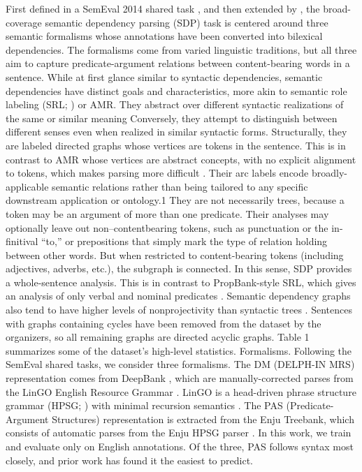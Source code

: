 \documentclass[11pt,a4paper]{article}
\begin{document}
First defined in a SemEval 2014 shared task
\cite{oepen2014semeval}, and then extended by \citet{oepen2015semeval},
the broad-coverage semantic dependency parsing (SDP) task is centered around three
semantic formalisms whose annotations have been
converted into bilexical dependencies. The formalisms come
from varied linguistic traditions, but all three aim
to capture predicate-argument relations between
content-bearing words in a sentence.
While at first glance similar to syntactic dependencies,
semantic dependencies have distinct
goals and characteristics, more akin to semantic
role labeling (SRL; \citet{gildea2002automatic}) or
AMR. They abstract over different
syntactic realizations of the same or similar meaning
Conversely, they attempt to distinguish
between different senses even when realized
in similar syntactic forms.
Structurally, they are labeled directed graphs
whose vertices are tokens in the sentence. This
is in contrast to AMR whose vertices are abstract
concepts, with no explicit alignment to tokens,
which makes parsing more difficult \cite{flanigan2014discriminative}.
Their arc labels encode broadly-applicable semantic relations rather than being tailored
to any specific downstream application or
ontology.1 They are not necessarily trees, because
a token may be an argument of more than one
predicate. Their analyses may optionally leave out non–contentbearing
tokens, such as punctuation or the in-
finitival ``to,'' or prepositions that simply mark
the type of relation holding between other words.
But when restricted to content-bearing tokens (including
adjectives, adverbs, etc.), the subgraph
is connected. In this sense, SDP provides a
whole-sentence analysis. This is in contrast to
PropBank-style SRL, which gives an analysis of
only verbal and nominal predicates \cite{Palmer:05}.
Semantic dependency graphs also tend to
have higher levels of nonprojectivity than syntactic
trees \cite{oepen2014semeval}. Sentences with
graphs containing cycles have been removed from
the dataset by the organizers, so all remaining
graphs are directed acyclic graphs. Table 1 summarizes
some of the dataset’s high-level statistics.
Formalisms. Following the SemEval shared
tasks, we consider three formalisms. The
DM (DELPH-IN MRS) representation comes
from DeepBank \cite{flickinger2012deepbank}, which
are manually-corrected parses from the LinGO
English Resource Grammar \cite{copestake2000open}.
LinGO is a head-driven phrase
structure grammar (HPSG; \citet{pollard1994head})
with minimal recursion semantics \cite{copestake2005minimal}.
The PAS (Predicate-Argument Structures)
representation is extracted from the Enju
Treebank, which consists of automatic parses from
the Enju HPSG parser \cite{ninomiya2006extremely}.
In this work, we train and evaluate only on English annotations.
Of the three, PAS follows syntax most closely,
and prior work has found it the easiest to predict.
\end{document}
